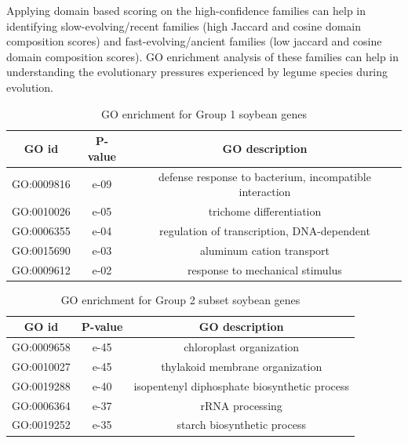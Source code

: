 \documentclass{article}
\begin{document}
		Applying domain based scoring on the high-confidence families can help in identifying slow-evolving/recent families (high Jaccard and cosine domain composition scores) and fast-evolving/ancient families (low jaccard and cosine domain composition scores). GO enrichment analysis of these families can help in understanding the evolutionary pressures experienced by legume species during evolution.
		
		\begin{table}[h!]
			\centering
			\begin{tabular}{|c |c |c |} 
				\hline
				GO id & P-value & GO description \\
				\hline\hline
				GO:0009816 & e-09 & defense response to bacterium, incompatible interaction \\ 
				\hline
				GO:0010026 & e-05 & trichome differentiation \\
				\hline
				GO:0006355 & e-04 & regulation of transcription, DNA-dependent \\
				\hline
				GO:0015690 & e-03 & aluminum cation transport \\
				\hline
				GO:0009612 & e-02 & response to mechanical stimulus \\ 
				\hline
			\end{tabular}
			\caption{GO enrichment for Group 1 soybean genes}
			\label{tab:gotable_group1}
		\end{table}
		
		\begin{table}[h!]
			\centering
			\begin{tabular}{|c |c |c |} 
				\hline
				GO id & P-value & GO description \\
				\hline\hline
				GO:0009658 & e-45 & chloroplast organization \\ 
				\hline
				GO:0010027 & e-45 & thylakoid membrane organization \\
				\hline
				GO:0019288 & e-40 & isopentenyl diphosphate biosynthetic process \\
				\hline
				GO:0006364 & e-37 & rRNA processing \\
				\hline
				GO:0019252 & e-35 & starch biosynthetic process \\ 
				\hline
			\end{tabular}
			\caption{GO enrichment for Group 2 subset soybean genes}
			\label{tab:gotable_group2_subset}
		\end{table}
		
\end{document}
